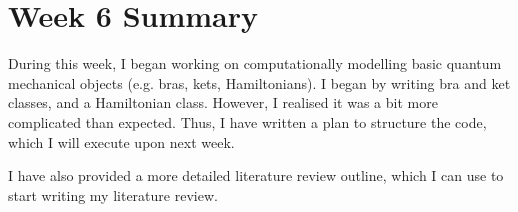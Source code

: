 \documentclass{article}
\begin{document}
\section*{Week 6 Summary}

\vspace{0.5cm}

During this week, I began working on computationally modelling basic quantum mechanical objects (e.g. bras, kets, Hamiltonians). I began by writing bra and ket classes, and a Hamiltonian class. However, I realised it was a bit more complicated than expected. Thus, I have written a plan to structure the code, which I will execute upon next week.

I have also provided a more detailed literature review outline, which I can use to start writing my literature review.
\end{document}
